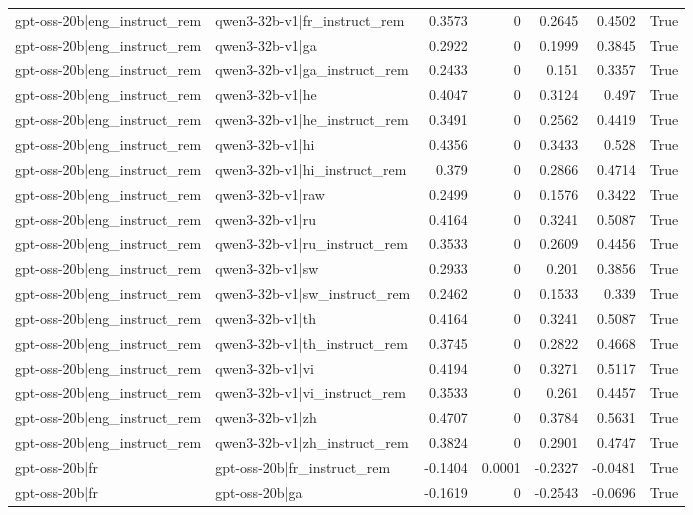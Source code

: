 \begin{table}
\begin{tabular}{l l r r r r l}
gpt-oss-20b|eng_instruct_rem & qwen3-32b-v1|fr_instruct_rem & 0.3573 & 0 & 0.2645 & 0.4502 & True \\
gpt-oss-20b|eng_instruct_rem & qwen3-32b-v1|ga & 0.2922 & 0 & 0.1999 & 0.3845 & True \\
gpt-oss-20b|eng_instruct_rem & qwen3-32b-v1|ga_instruct_rem & 0.2433 & 0 & 0.151 & 0.3357 & True \\
gpt-oss-20b|eng_instruct_rem & qwen3-32b-v1|he & 0.4047 & 0 & 0.3124 & 0.497 & True \\
gpt-oss-20b|eng_instruct_rem & qwen3-32b-v1|he_instruct_rem & 0.3491 & 0 & 0.2562 & 0.4419 & True \\
gpt-oss-20b|eng_instruct_rem & qwen3-32b-v1|hi & 0.4356 & 0 & 0.3433 & 0.528 & True \\
gpt-oss-20b|eng_instruct_rem & qwen3-32b-v1|hi_instruct_rem & 0.379 & 0 & 0.2866 & 0.4714 & True \\
gpt-oss-20b|eng_instruct_rem & qwen3-32b-v1|raw & 0.2499 & 0 & 0.1576 & 0.3422 & True \\
gpt-oss-20b|eng_instruct_rem & qwen3-32b-v1|ru & 0.4164 & 0 & 0.3241 & 0.5087 & True \\
gpt-oss-20b|eng_instruct_rem & qwen3-32b-v1|ru_instruct_rem & 0.3533 & 0 & 0.2609 & 0.4456 & True \\
gpt-oss-20b|eng_instruct_rem & qwen3-32b-v1|sw & 0.2933 & 0 & 0.201 & 0.3856 & True \\
gpt-oss-20b|eng_instruct_rem & qwen3-32b-v1|sw_instruct_rem & 0.2462 & 0 & 0.1533 & 0.339 & True \\
gpt-oss-20b|eng_instruct_rem & qwen3-32b-v1|th & 0.4164 & 0 & 0.3241 & 0.5087 & True \\
gpt-oss-20b|eng_instruct_rem & qwen3-32b-v1|th_instruct_rem & 0.3745 & 0 & 0.2822 & 0.4668 & True \\
gpt-oss-20b|eng_instruct_rem & qwen3-32b-v1|vi & 0.4194 & 0 & 0.3271 & 0.5117 & True \\
gpt-oss-20b|eng_instruct_rem & qwen3-32b-v1|vi_instruct_rem & 0.3533 & 0 & 0.261 & 0.4457 & True \\
gpt-oss-20b|eng_instruct_rem & qwen3-32b-v1|zh & 0.4707 & 0 & 0.3784 & 0.5631 & True \\
gpt-oss-20b|eng_instruct_rem & qwen3-32b-v1|zh_instruct_rem & 0.3824 & 0 & 0.2901 & 0.4747 & True \\
gpt-oss-20b|fr & gpt-oss-20b|fr_instruct_rem & -0.1404 & 0.0001 & -0.2327 & -0.0481 & True \\
gpt-oss-20b|fr & gpt-oss-20b|ga & -0.1619 & 0 & -0.2543 & -0.0696 & True \\

\end{tabular}
\end{table}

